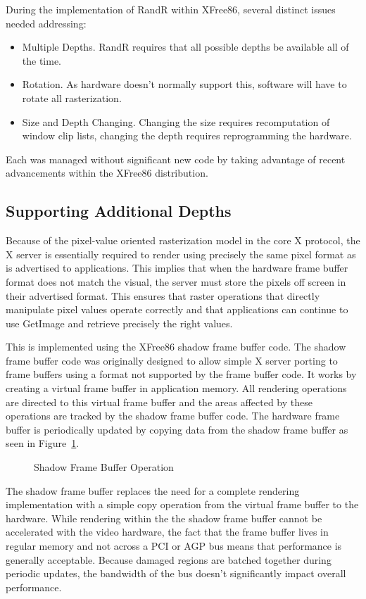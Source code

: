 \documentclass[twocolumn]{article}
\begin{document}
During the implementation of RandR within XFree86, several distinct issues
needed addressing:
\begin{itemize}
\item Multiple Depths.  RandR requires that all possible depths be available
all of the time.
\item Rotation.  As hardware doesn't normally support this, software will
have to rotate all rasterization.
\item Size and Depth Changing.  Changing the size requires recomputation of
window clip lists, changing the depth requires reprogramming the hardware.
\end{itemize}
Each was managed without significant new code by taking advantage of recent
advancements within the XFree86 distribution.

\subsection{Supporting Additional Depths}

Because of the pixel-value oriented rasterization model in the core X
protocol, the X server is essentially required to render using precisely the
same pixel format as is advertised to applications.  This implies that
when the hardware frame buffer format does not match the visual, the server
must store the pixels off screen in their advertised format.  This ensures
that raster operations that directly manipulate pixel values operate
correctly and that applications can continue to use GetImage and retrieve
precisely the right values.

This is implemented using the XFree86 shadow frame
buffer code.  The shadow frame buffer code was originally designed to allow
simple X server porting to frame buffers using a format not supported by the
frame buffer code.  It works by creating a virtual frame buffer in
application memory.  All rendering operations are directed to this virtual
frame buffer and the areas affected by these operations are tracked by the
shadow frame buffer code.  The hardware frame buffer is periodically updated
by copying data from the shadow frame buffer as seen in
Figure~\ref{shadow.figure}.
\begin{figure}
\begin{center}
\caption{Shadow Frame Buffer Operation}
\label{shadow.figure}
\end{center}
\end{figure}

The shadow frame buffer replaces the need for a complete rendering
implementation with a simple copy operation from the virtual frame buffer to
the hardware.  While rendering within the the shadow frame buffer cannot be
accelerated with the video hardware, the fact that the frame buffer lives in
regular memory and not across a PCI or AGP bus means that performance is
generally acceptable.  Because damaged regions are batched together during
periodic updates, the bandwidth of the bus doesn't significantly impact
overall performance.
\end{document}
